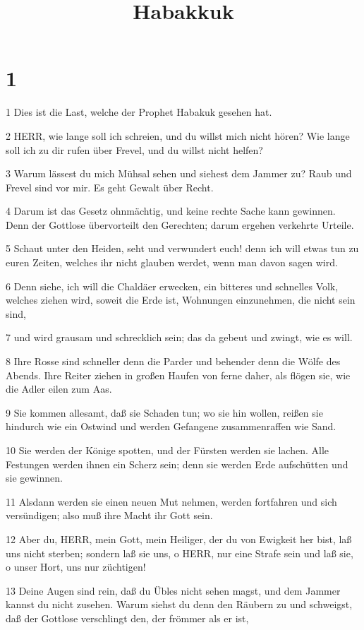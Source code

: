 

\title{Habakkuk}


\chapter{1}

\par 1 Dies ist die Last, welche der Prophet Habakuk gesehen hat.
\par 2 HERR, wie lange soll ich schreien, und du willst mich nicht hören? Wie lange soll ich zu dir rufen über Frevel, und du willst nicht helfen?
\par 3 Warum lässest du mich Mühsal sehen und siehest dem Jammer zu? Raub und Frevel sind vor mir. Es geht Gewalt über Recht.
\par 4 Darum ist das Gesetz ohnmächtig, und keine rechte Sache kann gewinnen. Denn der Gottlose übervorteilt den Gerechten; darum ergehen verkehrte Urteile.
\par 5 Schaut unter den Heiden, seht und verwundert euch! denn ich will etwas tun zu euren Zeiten, welches ihr nicht glauben werdet, wenn man davon sagen wird.
\par 6 Denn siehe, ich will die Chaldäer erwecken, ein bitteres und schnelles Volk, welches ziehen wird, soweit die Erde ist, Wohnungen einzunehmen, die nicht sein sind,
\par 7 und wird grausam und schrecklich sein; das da gebeut und zwingt, wie es will.
\par 8 Ihre Rosse sind schneller denn die Parder und behender denn die Wölfe des Abends. Ihre Reiter ziehen in großen Haufen von ferne daher, als flögen sie, wie die Adler eilen zum Aas.
\par 9 Sie kommen allesamt, daß sie Schaden tun; wo sie hin wollen, reißen sie hindurch wie ein Ostwind und werden Gefangene zusammenraffen wie Sand.
\par 10 Sie werden der Könige spotten, und der Fürsten werden sie lachen. Alle Festungen werden ihnen ein Scherz sein; denn sie werden Erde aufschütten und sie gewinnen.
\par 11 Alsdann werden sie einen neuen Mut nehmen, werden fortfahren und sich versündigen; also muß ihre Macht ihr Gott sein.
\par 12 Aber du, HERR, mein Gott, mein Heiliger, der du von Ewigkeit her bist, laß uns nicht sterben; sondern laß sie uns, o HERR, nur eine Strafe sein und laß sie, o unser Hort, uns nur züchtigen!
\par 13 Deine Augen sind rein, daß du Übles nicht sehen magst, und dem Jammer kannst du nicht zusehen. Warum siehst du denn den Räubern zu und schweigst, daß der Gottlose verschlingt den, der frömmer als er ist,
